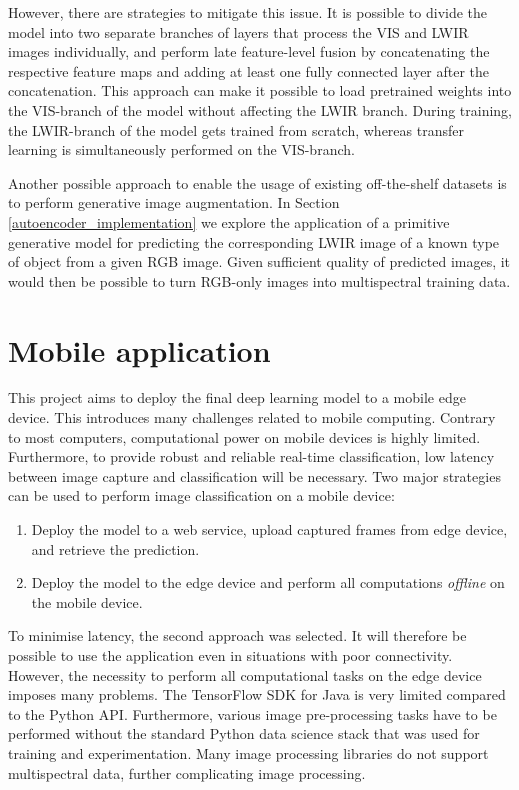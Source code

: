 \documentclass{l4proj}
\begin{document}
However, there are strategies to mitigate this issue. It is possible to divide the model into two separate branches of layers that process the VIS and LWIR images individually, and perform late feature-level fusion \citep{guo_face_2017} by concatenating the respective feature maps and adding at least one fully connected layer after the concatenation. This approach can make it possible to load pretrained weights into the VIS-branch of the model without affecting the LWIR branch. During training, the LWIR-branch of the model gets trained from scratch, whereas transfer learning is simultaneously performed on the VIS-branch.

Another possible approach to enable the usage of existing off-the-shelf datasets is to perform generative image augmentation. In Section \ref{autoencoder_implementation} we explore the application of a primitive generative model for predicting the corresponding LWIR image of a known type of object from a given RGB image. Given sufficient quality of predicted images, it would then be possible to turn RGB-only images into multispectral training data.


\section{Mobile application}

This project aims to deploy the final deep learning model to a mobile edge device. This introduces many challenges related to mobile computing. Contrary to most computers, computational power on mobile devices is highly limited. Furthermore, to provide robust and reliable real-time classification, low latency between image capture and classification will be necessary. Two major strategies can be used to perform image classification on a mobile device:

\begin{enumerate}
  \item Deploy the model to a web service, upload captured frames from edge device, and retrieve the prediction.
  \item Deploy the model to the edge device and perform all computations \textit{offline} on the mobile device.
\end{enumerate}

To minimise latency, the second approach was selected. It will therefore be possible to use the application even in situations with poor connectivity. However, the necessity to perform all computational tasks on the edge device imposes many problems. The TensorFlow SDK for Java is very limited compared to the Python API. Furthermore, various image pre-processing tasks have to be performed without the standard Python data science stack that was used for training and experimentation. Many image processing libraries do not support multispectral data, further complicating image processing.
\end{document}
